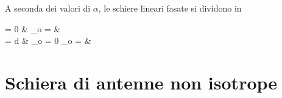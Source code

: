 		A seconda dei valori di $\alpha$, le schiere lineari fasate si dividono in 
		\begin{esp*}
			\alpha = 0 
				& \implies \theta_o =  
				&  \\
			\alpha = \pm \beta d 
				& \implies \theta_o = 0 \land \theta_o = \pi 
				&  \\
		\end{esp*}

\section{Schiera di antenne non isotrope}
	

		